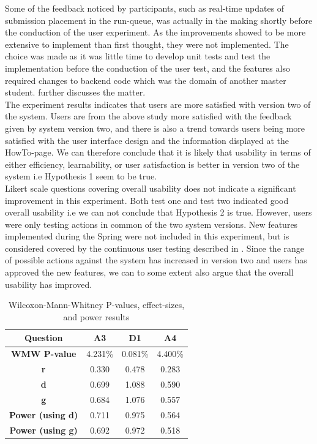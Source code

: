 Some of the feedback noticed by participants, such as real-time updates of submission placement in the run-queue, was actually in the making shortly before the conduction of the user experiment. As the improvements showed to be more extensive to implement than first thought, they were not implemented. The choice was made as it was little time to develop unit tests and test the implementation before the conduction of the user test, and the features also required changes to backend code which was the domain of another master student.  further discusses the matter. \\

The experiment results indicates that users are more satisfied with version two of the system. Users are from the above study more satisfied with the feedback given by system version two, and there is also a trend towards users being more satisfied with the user interface design and the information displayed at the HowTo-page. We can therefore conclude that it is likely that usability in terms of either efficiency, learnability, or user satisfaction is better in version two of the system i.e Hypothesis 1 seem to be true. \\

Likert scale questions covering overall usability does not indicate a significant improvement in this experiment. Both test one and test two indicated good overall usability i.e we can not conclude that Hypothesis 2 is true. However, users were only testing actions in common of the two system versions. New features implemented during the Spring were not included in this experiment, but is considered covered by the continuous user testing described in . Since the range of possible actions against the system has increased in version two and users has approved the new features, we can to some extent also argue that the overall usability has improved.

\begin{table}[t!]
    \centering
    \begin{tabular}{|c||c||c||c||}
      \hline
      \textbf{Question} & \textbf{A3} & \textbf{D1} & \textbf{A4} \\\hline
      \textbf{WMW P-value} & 4.231\% & 0.081\% & 4.400\%  \\ \hline
      \textbf{r} & 0.330 & 0.478 & 0.283\\ \hline
      \textbf{d} & 0.699 & 1.088 & 0.590 \\ \hline
      \textbf{g} & 0.684 & 1.076 & 0.557\\ \hline
      \textbf{Power (using d)} & 0.711 & 0.975 & 0.564 \\ \hline
      \textbf{Power (using g)} & 0.692 & 0.972 & 0.518 \\ \hline
    \end{tabular}
    \caption{Wilcoxon-Mann-Whitney P-values, effect-sizes, and power results}
    \label{tab:significant-results}
\end{table}

